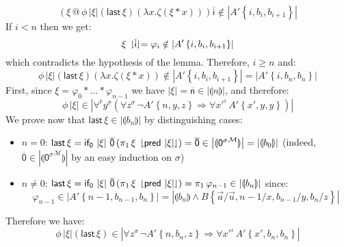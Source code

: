 \documentclass{CSML}
\makeatletter
\renewcommand{\ldots}{...}
\newcommand*\SortA{\sigma}
\newcommand*\LogSortedTerm[2]{#1^{#2}}
\newcommand*\LogVarA{x}
\newcommand*\LogVarB{y}
\newcommand*\LogVarC{z}
\newcommand*\LogVarD{u}
\newcommand*\LogConst[1]{\mathsf{#1}}
\newcommand*\LogImp{\mathbin{\Rightarrow}}
\newcommand*\LogAnd{\mathbin{\wedge}}
\newcommand*\LogRel[1]{\llparenthesis#1\rrparenthesis}
\newcommand*\LogForallRel{\forall^\mathrm{r}}
\newcommand*\LogFormA{A}
\newcommand*\LogFormB{B}
\newcommand*\LogSubst[1]{\left\{#1\right\}}
\newcommand*\ModM{\mathcal{M}}
\newcommand*\ModElemA{a}
\newcommand*\ModElemB{b}
\newcommand*\ModMInterp[1]{{#1}^\ModM}
\newcommand*\LmVarA{x}
\newcommand*\LmConst[1]{\mathsf{#1}}
\newcommand*\LmProj{\pi}
\newcommand*\CatRCHomA\phi
\newcommand*\CatRCHomC\zeta
\newcommand*\CatRCHomD\xi
\newcommand*\CatRCHomE\varphi
\newcommand*\RealVal[1]{\left|#1\right|}
\newcommand*\CASort\iota
\newcommand*\CALogZ{\LogConst{0}}
\newcommand*\CALmn[1]{\LmConst{\overline{#1}}}
\newcommand*\CALmifz{\LmConst{if_0}}
\newcommand*\CALmpred{\LmConst{pred}}
\newcommand*\CALmconcat{\mathbin{@}}
\newcommand*\CALmextend{\mathbin{*}}
\newcommand*\CALmlen[1]{\left|#1\right|}
\newcommand*\CALmind[2]{#1\,\downharpoonright\mkern-5mu#2\mkern-5mu\downharpoonleft}
\makeatother
\begin{document}
$$\left(\CatRCHomD\CALmconcat\CatRCHomA\,\CALmlen{\CatRCHomD}\left(\LmConst{last}\,\CatRCHomD\right)\left(\lambda\LmVarA.\CatRCHomC\left(\CatRCHomD\CALmextend\LmVarA\right)\right)\right)\CALmn{i}\notin\RealVal{\LogFormA'\LogSubst{i,\ModElemB_i,\ModElemB_{i+1}}}$$
If $i<n$ then we get:
$$\CALmind{\CatRCHomD}{\CALmn{i}}=\CatRCHomE_i\notin\RealVal{\LogFormA'\LogSubst{i,\ModElemB_i,\ModElemB_{i+1}}}$$
which contradicts the hypothesis of the lemma. Therefore, $i\geq n$ and:
$$\CatRCHomA\,\CALmlen{\CatRCHomD}\left(\LmConst{last}\,\CatRCHomD\right)\left(\lambda\LmVarA.\CatRCHomC\left(\CatRCHomD\CALmextend\LmVarA\right)\right)\notin\RealVal{\LogFormA'\LogSubst{i,\ModElemB_i,\ModElemB_{i+1}}}=\RealVal{\LogFormA'\LogSubst{i,\ModElemB_n,\ModElemB_n}}$$
First, since $\CatRCHomD=\CatRCHomE_0\CALmextend\ldots\CALmextend\CatRCHomE_{n-1}$ we have $\CALmlen{\CatRCHomD}=\CALmn{n}\in\RealVal{\LogRel{n}}$, and therefore:
$$\CatRCHomA\,\CALmlen{\CatRCHomD}\in\RealVal{\LogForallRel\LogSortedTerm{\LogVarB}{\SortA}\left(\forall\LogSortedTerm{\LogVarC}{\SortA}\,\neg\LogFormA'\LogSubst{n,\LogVarB,\LogVarC}\LogImp\forall\LogSortedTerm{\LogVarA'}{\CASort}\,\LogFormA'\LogSubst{\LogVarA',\LogVarB,\LogVarB}\right)}$$
We prove now that $\LmConst{last}\,\CatRCHomD\in\RealVal{\LogRel{\ModElemB_n}}$ by distinguishing cases:
\begin{itemize}
\item$n=0$: $\LmConst{last}\,\CatRCHomD=\CALmifz\,\CALmlen{\CatRCHomD}\,\CALmn{0}\left(\LmProj_1\,\CALmind{\CatRCHomD}{\CALmpred\,\CALmlen{\CatRCHomD}}\right)=\CALmn{0}\in\RealVal{\LogRel{\ModMInterp{\LogSortedTerm{\CALogZ}{\SortA}}}}=\RealVal{\LogRel{\ModElemB_0}}$ (indeed, $\CALmn{0}\in\RealVal{\LogRel{\ModMInterp{\LogSortedTerm{\CALogZ}{\SortA}}}}$ by an easy induction on $\SortA$)
\item$n\neq0$: $\LmConst{last}\,\CatRCHomD=\CALmifz\,\CALmlen{\CatRCHomD}\,\CALmn{0}\left(\LmProj_1\,\CALmind{\CatRCHomD}{\CALmpred\,\CALmlen{\CatRCHomD}}\right)=\LmProj_1\,\CatRCHomE_{n-1}\in\RealVal{\LogRel{\ModElemB_n}}$ since:
$$\CatRCHomE_{n-1}\in\RealVal{\LogFormA'\LogSubst{n-1,\ModElemB_{n-1},\ModElemB_n}}=\RealVal{\LogRel{\ModElemB_n}\LogAnd\LogFormB\LogSubst{\vec{\ModElemA}/\vec{\LogVarD},n-1/\LogVarA,\ModElemB_{n-1}/\LogVarB,\ModElemB_n/\LogVarC}}$$
\end{itemize}
Therefore we have:
$$\CatRCHomA\,\CALmlen{\CatRCHomD}\left(\LmConst{last}\,\CatRCHomD\right)\in\RealVal{\forall\LogSortedTerm{\LogVarC}{\SortA}\,\neg\LogFormA'\LogSubst{n,\ModElemB_n,\LogVarC}\LogImp\forall\LogSortedTerm{\LogVarA'}{\CASort}\,\LogFormA'\LogSubst{\LogVarA',\ModElemB_n,\ModElemB_n}}$$
\end{document}

